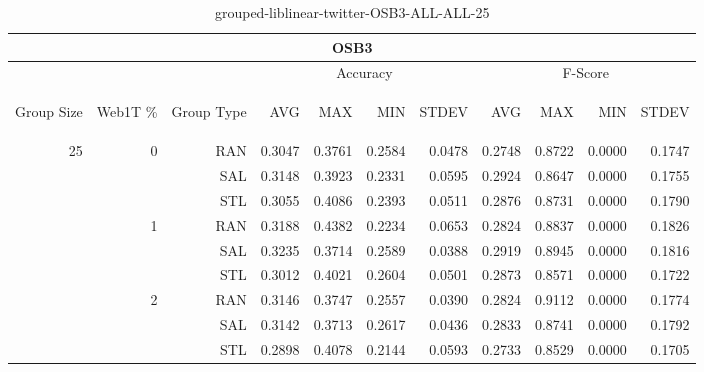 \begin{center}
\begin{table}[htbp]
\begin{tabular}{ | r | r | r | r | r | r | r | r | r | r | r |}
\hline
\multicolumn{11}{|c|}{OSB3}\\
\hline
 & & & \multicolumn{4}{|c|}{Accuracy} & \multicolumn{4}{|c|}{F-Score}\\ \cline{4-11}
\begin{sideways}Group Size\end{sideways} & \begin{sideways}Web1T \%\end{sideways} & \begin{sideways}Group Type\end{sideways} & \begin{sideways}AVG\end{sideways} & \begin{sideways}MAX\end{sideways} & \begin{sideways}MIN\end{sideways} & \begin{sideways}STDEV\end{sideways} & \begin{sideways}AVG\end{sideways} & \begin{sideways}MAX\end{sideways} & \begin{sideways}MIN\end{sideways} & \begin{sideways}STDEV\end{sideways}\\
\hline
\multirow{9}{*}{25}
 & \multirow{3}{*}{0} & RAN & 0.3047 & 0.3761 & 0.2584 & 0.0478 & 0.2748 & 0.8722 & 0.0000 & 0.1747\\ \cline{3-11}
 &   & SAL & 0.3148 & 0.3923 & 0.2331 & 0.0595 & 0.2924 & 0.8647 & 0.0000 & 0.1755\\ \cline{3-11}
 &   & STL & 0.3055 & 0.4086 & 0.2393 & 0.0511 & 0.2876 & 0.8731 & 0.0000 & 0.1790\\ \cline{2-11}
 & \multirow{3}{*}{1} & RAN & 0.3188 & 0.4382 & 0.2234 & 0.0653 & 0.2824 & 0.8837 & 0.0000 & 0.1826\\ \cline{3-11}
 &   & SAL & 0.3235 & 0.3714 & 0.2589 & 0.0388 & 0.2919 & 0.8945 & 0.0000 & 0.1816\\ \cline{3-11}
 &   & STL & 0.3012 & 0.4021 & 0.2604 & 0.0501 & 0.2873 & 0.8571 & 0.0000 & 0.1722\\ \cline{2-11}
 & \multirow{3}{*}{2} & RAN & 0.3146 & 0.3747 & 0.2557 & 0.0390 & 0.2824 & 0.9112 & 0.0000 & 0.1774\\ \cline{3-11}
 &   & SAL & 0.3142 & 0.3713 & 0.2617 & 0.0436 & 0.2833 & 0.8741 & 0.0000 & 0.1792\\ \cline{3-11}
 &   & STL & 0.2898 & 0.4078 & 0.2144 & 0.0593 & 0.2733 & 0.8529 & 0.0000 & 0.1705\\ \cline{2-11}
\hline
\end{tabular}
\caption{grouped-liblinear-twitter-OSB3-ALL-ALL-25}
\end{table}
\end{center}

